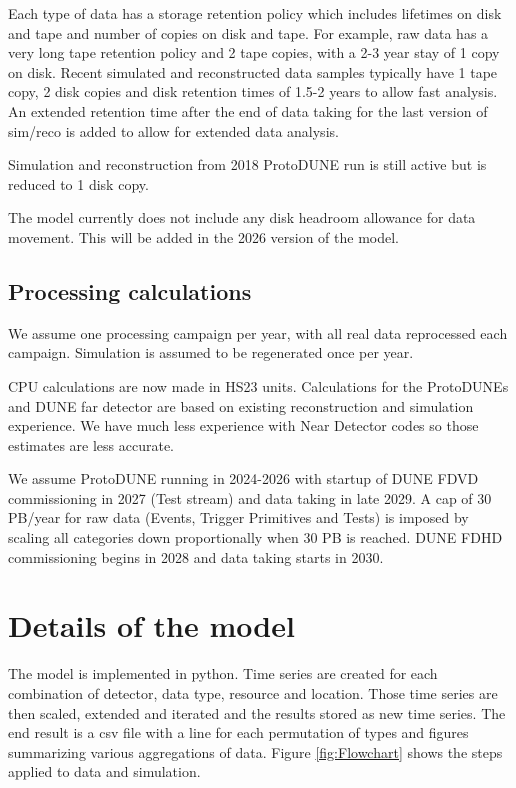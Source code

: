\documentclass[12pt]{article}
\begin{document}
Each type of data has a storage retention policy which includes lifetimes on disk and tape and number of copies on disk and tape.  For example, raw data has a very long tape retention policy and 2 tape copies, with a 2-3 year stay of 1 copy on disk.   Recent simulated and reconstructed data samples typically have 1 tape copy, 2 disk copies and disk retention times of 1.5-2 years to allow fast analysis.   An extended retention time after the end of data taking for the last version of sim/reco is added to allow for extended data analysis. 

Simulation and reconstruction from 2018 ProtoDUNE run is still active but is reduced to 1 disk copy. 

The model currently does not include any disk headroom allowance for data movement.  This will be added in the 2026 version of the model. 

\subsection{Processing calculations}

 We assume one processing campaign per year, with all real data reprocessed each campaign.   Simulation is assumed to be regenerated  once per year.
   
CPU calculations are now made in HS23 units.  Calculations for the ProtoDUNEs and DUNE far detector are based on existing reconstruction and simulation experience.  We have much less experience with Near Detector codes so those estimates are less accurate.

We assume ProtoDUNE running in 2024-2026 with startup of DUNE FDVD commissioning in 2027 (Test stream) and data taking in late 2029. A cap of 30 PB/year for raw data (Events, Trigger Primitives and Tests) is imposed by scaling all categories down proportionally when 30 PB is reached. DUNE FDHD commissioning begins in 2028 and data taking starts in 2030.
   
     
  \section{Details of the model}
  
  The model is implemented in python.  Time series are created for each combination of detector, data type, resource and location.  Those time series are then  scaled, extended and iterated and the results stored as new time series.  The end result is a csv file with a line for each permutation of types and figures summarizing various aggregations of data. Figure \ref{fig:Flowchart} shows the steps applied to data and simulation. 
  
\end{document}
